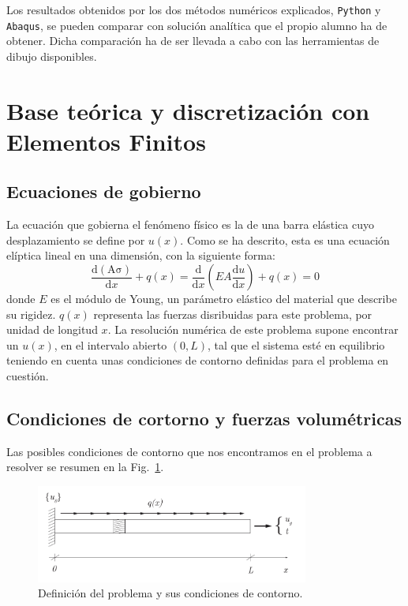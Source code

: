 \documentclass[spanish,a4paper,12pt]{article}
\begin{document}
Los resultados obtenidos por los dos métodos numéricos explicados, \texttt{Python} y  \texttt{Abaqus}, se pueden comparar con solución analítica que el propio alumno ha de obtener. Dicha comparación ha de ser llevada a cabo con las herramientas de dibujo disponibles.


\section{Base teórica y discretización con Elementos Finitos}
\label{sec:teoria}

\subsection{Ecuaciones de gobierno}

La ecuación que gobierna el fenómeno físico es la de una barra elástica cuyo  desplazamiento se define por \(u(x)\). Como se ha descrito, esta es una ecuación elíptica lineal en una dimensión, con la siguiente forma:
\begin{equation}\label{eq:gov}
\frac{\mathrm{d (A \sigma)}}{\mathrm{d} x} + q(x)
=\frac{\mathrm{d}}{\mathrm{d} x}\left(EA \frac{\mathrm{d} u}{\mathrm{d} x}\right)+q(x)=0
\end{equation}
donde  $E$ es el módulo de Young, un parámetro elástico del material que describe su rigidez. $q(x)$ representa las fuerzas disribuidas para este problema, por unidad de longitud $x$. La resolución numérica de este problema supone encontrar un \(u(x)\), en el intervalo abierto $(0,L)$, tal que el sistema esté en equilibrio teniendo en cuenta unas condiciones de contorno definidas para el problema en cuestión.

\subsection{Condiciones de cortorno y fuerzas volumétricas}

Las posibles condiciones de contorno que nos encontramos en el problema a resolver se resumen en la Fig.~\ref{fig:CC1D}.

\begin{figure}[!htp]
\centering
\includegraphics[width=0.8\textwidth]{figuras/1D.pdf}
\caption{Definición del problema y sus condiciones de contorno.}
\label{fig:CC1D}
\end{figure}
\end{document}
